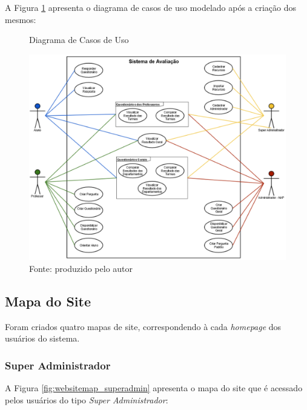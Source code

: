 \documentclass[
  12pt,       %
  openright,      %
  oneside,      %
  a4paper,      %
  english,      %
  french,        %
  spanish,     %
  brazil        %
  ]{abntex2-decsi}
\begin{document}
    A Figura \ref{fig:usecases_diagram} apresenta o diagrama de casos de uso modelado após a criação dos mesmos:
    
    \begin{figure}[h]	
        \centering
        \caption{Diagrama de Casos de Uso}						   			\label{fig:usecases_diagram}
        \includegraphics[scale=0.7]{img/usecases_diagram}
        \caption*{Fonte: produzido pelo autor}
    \end{figure}
    
	\subsection{Mapa do Site}
    
    Foram criados quatro mapas de site, correspondendo à cada \textit{homepage} dos usuários do sistema.
    
        \subsubsection{Super Administrador}
	
		A Figura \ref{fig:websitemap_superadmin} apresenta o mapa do site que é acessado pelos usuários do tipo \textit{Super Administrador}:
        
\end{document}
